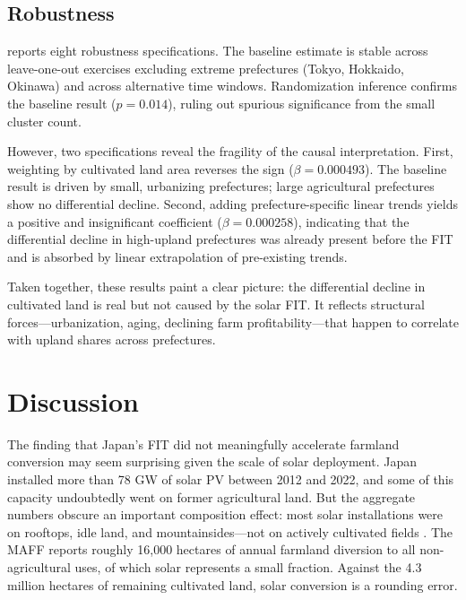 \documentclass[12pt]{article}
\begin{document}
\subsection{Robustness}



 reports eight robustness specifications. The baseline estimate is stable across leave-one-out exercises excluding extreme prefectures (Tokyo, Hokkaido, Okinawa) and across alternative time windows. Randomization inference confirms the baseline result ($p = 0.014$), ruling out spurious significance from the small cluster count.

However, two specifications reveal the fragility of the causal interpretation. First, weighting by cultivated land area reverses the sign ($\beta = 0.000493$). The baseline result is driven by small, urbanizing prefectures; large agricultural prefectures show no differential decline. Second, adding prefecture-specific linear trends yields a positive and insignificant coefficient ($\beta = 0.000258$), indicating that the differential decline in high-upland prefectures was already present before the FIT and is absorbed by linear extrapolation of pre-existing trends.

Taken together, these results paint a clear picture: the differential decline in cultivated land is real but not caused by the solar FIT. It reflects structural forces---urbanization, aging, declining farm profitability---that happen to correlate with upland shares across prefectures.


\section{Discussion}

The finding that Japan's FIT did not meaningfully accelerate farmland conversion may seem surprising given the scale of solar deployment. Japan installed more than 78 GW of solar PV between 2012 and 2022, and some of this capacity undoubtedly went on former agricultural land. But the aggregate numbers obscure an important composition effect: most solar installations were on rooftops, idle land, and mountainsides---not on actively cultivated fields \citep{Yamamoto2020}. The MAFF reports roughly 16,000 hectares of annual farmland diversion to all non-agricultural uses, of which solar represents a small fraction. Against the 4.3 million hectares of remaining cultivated land, solar conversion is a rounding error.
\end{document}
